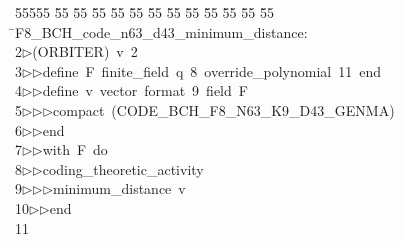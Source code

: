%
%
\begin{tabbing}
55555 \= 55 \= 55 \= 55 \= 55 \= 55 \= 55 \= 55 \= 55 \= 55 \= 55 \= 55 \= 55 \= \>F8\_BCH\_code\_n63\_d43\_minimum\_distance:\\[0pt]
2\>$\triangleright$\>(ORBITER)\ v\ 2\ \\[0pt]
3\>$\triangleright$\>$\triangleright$\>define\ F\ finite\_field\ q\ 8\ override\_polynomial\ 11\ end\ \\[0pt]
4\>$\triangleright$\>$\triangleright$\>define\ v\ vector\ format\ 9\ field\ F\ \\[0pt]
5\>$\triangleright$\>$\triangleright$\>$\triangleright$\>compact\ (CODE\_BCH\_F8\_N63\_K9\_D43\_GENMA)\ \\[0pt]
6\>$\triangleright$\>$\triangleright$\>end\ \\[0pt]
7\>$\triangleright$\>$\triangleright$\>with\ F\ do\ \\[0pt]
8\>$\triangleright$\>$\triangleright$\>coding\_theoretic\_activity\ \\[0pt]
9\>$\triangleright$\>$\triangleright$\>$\triangleright$\>minimum\_distance\ v\ \\[0pt]
10\>$\triangleright$\>$\triangleright$\>end\\[0pt]
11\>\end{tabbing}
